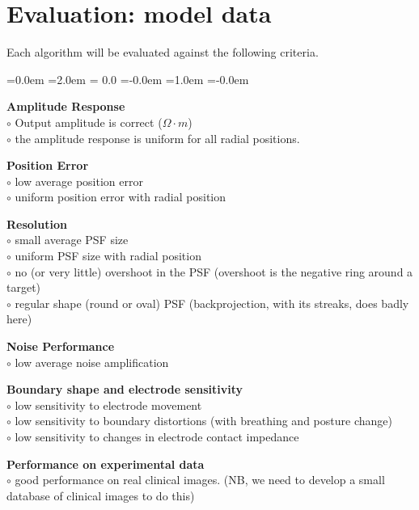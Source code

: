 \documentclass[letterpaper,twocolumn,11pt]{article}
\begin{document}
\section{Evaluation: model data}

Each algorithm will be evaluated against the
following criteria.

\begin{list}{\bf {}.}
  {\leftmargin=0.0em \itemindent=2.0em
    \topsep= 0.0\baselineskip
    \itemsep=-0.0em
    \listparindent=1.0em \parsep=-0.0em
    }

\item {\bf Amplitude Response}
\\ \noindent $\circ$
  Output amplitude is correct ($\Omega \cdot m$)
\\ \noindent $\circ$ 
  the amplitude response is uniform for all radial positions.

\item {\bf Position Error}
\\ \noindent $\circ$
  low average position error
\\ \noindent $\circ$
  uniform position error with radial position

\item {\bf Resolution}
\\ \noindent $\circ$
      small average PSF size
\\ \noindent $\circ$
      uniform PSF size with radial position
\\ \noindent $\circ$
      no (or very little) overshoot in the PSF
  (overshoot is the negative ring around a target)
\\ \noindent $\circ$
      regular shape (round or oval) PSF
  (backprojection, with its streaks, does badly here)

\item {\bf Noise Performance}
\\ \noindent $\circ$
         low average noise amplification

\item {\bf Boundary shape and electrode sensitivity}
\\ \noindent $\circ$
      low sensitivity to electrode movement
\\ \noindent $\circ$
      low sensitivity to boundary distortions
         (with breathing and posture change)
\\ \noindent $\circ$
      low sensitivity to changes in electrode contact impedance

\item {\bf Performance on experimental data}
\\ \noindent $\circ$
 good performance on real clinical images.
     (NB, we need to develop a small database of 
          clinical images to do this)
\end{list}
\end{document}
